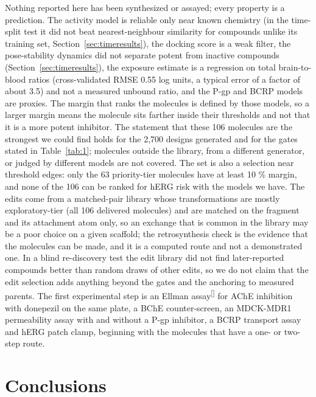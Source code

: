 \documentclass[11pt,a4paper]{article}
\renewcommand{\cite}[1]{\textsuperscript{[\citenum{#1}]}}
\begin{document}
Nothing reported here has been synthesized or assayed; every property is a prediction. The activity model is reliable only near known chemistry (in the time-split test it did not beat nearest-neighbour similarity for compounds unlike its training set, Section~\ref{sec:timeresults}), the docking score is a weak filter, the pose-stability dynamics did not separate potent from inactive compounds (Section~\ref{sec:timeresults}), the exposure estimate is a regression on total brain-to-blood ratios (cross-validated RMSE 0.55 log units, a typical error of a factor of about 3.5) and not a measured unbound ratio, and the P-gp and BCRP models are proxies. The margin that ranks the molecules is defined by those models, so a larger margin means the molecule sits farther inside their thresholds and not that it is a more potent inhibitor. The statement that these 106 molecules are the strongest we could find holds for the 2,700 designs generated and for the gates stated in Table~\ref{tab:1}; molecules outside the library, from a different generator, or judged by different models are not covered. The set is also a selection near threshold edges: only the 63 priority-tier molecules have at least 10 \% margin, and none of the 106 can be ranked for hERG risk with the models we have. The edits come from a matched-pair library whose transformations are mostly exploratory-tier (all 106 delivered molecules) and are matched on the fragment and its attachment atom only, so an exchange that is common in the library may be a poor choice on a given scaffold; the retrosynthesis check is the evidence that the molecules can be made, and it is a computed route and not a demonstrated one. In a blind re-discovery test the edit library did not find later-reported compounds better than random draws of other edits, so we do not claim that the edit selection adds anything beyond the gates and the anchoring to measured parents. The first experimental step is an Ellman assay\cite{ellman} for AChE inhibition with donepezil on the same plate, a BChE counter-screen, an MDCK-MDR1 permeability assay with and without a P-gp inhibitor, a BCRP transport assay and hERG patch clamp, beginning with the molecules that have a one- or two-step route.

\section{Conclusions}
\label{sec:4}
\end{document}
